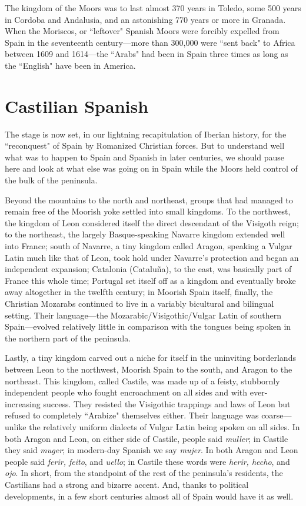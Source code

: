 The kingdom of the Moors was to last almost 370 years in Toledo, some 500 years in Cordoba and Andalusia, and an astonishing
770 years or more in Granada. When the Moriscos, or ``leftover"
Spanish Moors were forcibly expelled from Spain in the seventeenth century---more than 300,000 were ``sent back" to Africa between 1609
and 1614---the ``Arabs" had been in Spain three times as long as the
``English" have been in America.

\section{Castilian Spanish}

The stage is now set, in our lightning recapitulation of Iberian
history, for the ``reconquest" of Spain by Romanized Christian forces.
But to understand well what was to happen to Spain and Spanish in
later centuries, we should pause here and look at what else was going
on in Spain while the Moors held control of the bulk of the peninsula.

Beyond the mountains to the north and northeast, groups that
had managed to remain free of the Moorish yoke settled into small
kingdoms. To the northwest, the kingdom of Leon considered itself the
direct descendant of the Visigoth reign; to the northeast, the largely
Basque-speaking Navarre kingdom extended well into France; south of
Navarre, a tiny kingdom called Aragon, speaking a Vulgar Latin much
like that of Leon, took hold under Navarre's protection and began an
independent expansion; Catalonia (Cataluña), to the east, was basically
part of France this whole time; Portugal set itself off as a kingdom and
eventually broke away altogether in the twelfth century; in Moorish
Spain itself, finally, the Christian Mozarabs continued to live in a variably bicultural and bilingual setting. Their language---the Mozarabic/Visigothic/Vulgar Latin of southern Spain---evolved relatively little in
comparison with the tongues being spoken in the northern part of the
peninsula.

Lastly, a tiny kingdom carved out a niche for itself in the uninviting borderlands between Leon to the northwest, Moorish Spain to
the south, and Aragon to the northeast. This kingdom, called Castile,
was made up of a feisty, stubbornly independent people who fought
encroachment on all sides and with ever-increasing success. They resisted the Visigothic trappings and laws of Leon but refused to completely ``Arabize" themselves either. Their language was coarse---unlike the relatively uniform dialects of Vulgar Latin being spoken on all
sides. In both Aragon and Leon, on either side of Castile, people said
\emph{muller}; in Castile they said \emph{muger}; in modern-day Spanish we say
\emph{mujer}. In both Aragon and Leon people said \emph{ferir, feito}, and \emph{uello}; in
Castile these words were \emph{herir, hecho}, and \emph{ojo}. In short, from the
standpoint of the rest of the peninsula's residents, the Castilians had
a strong and bizarre accent. And, thanks to political developments, in
a few short centuries almost all of Spain would have it as well.

